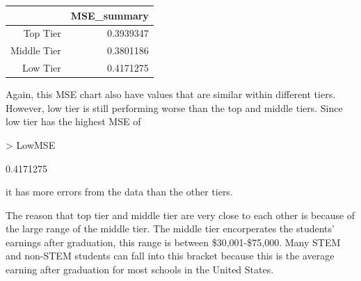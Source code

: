 \documentclass{article}
\begin{document}
\begin{table}[ht]
\centering
\begin{tabular}{rr}
  \hline
 & MSE\_summary \\ 
  \hline
Top Tier & 0.3939347 \\ 
  Middle Tier & 0.3801186 \\ 
  Low Tier & 0.4171275 \\ 
   \hline
\end{tabular}
\end{table}\noindent Again, this MSE chart also have values that are similar within different tiers. However, low tier is still performing worse than the top and middle tiers. Since low tier has the highest MSE of 
\begin{Schunk}
\begin{Sinput}
> LowMSE
\end{Sinput}
\begin{Soutput}
[1] 0.4171275
\end{Soutput}
\end{Schunk}
it has more errors from the data than the other tiers. 


The reason that top tier and middle tier are very close to each other is because of the large range of the middle tier. The middle tier encorperates the students' earnings after graduation, this range is between \$30,001-\$75,000. Many STEM and non-STEM students can fall into this bracket because this is the average earning after graduation for most schools in the United States.  
\newline
\end{document}
